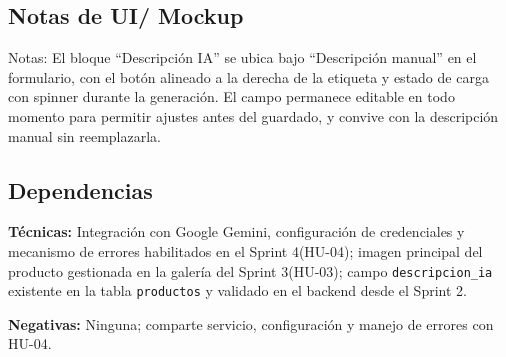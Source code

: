 \documentclass[12pt,a4paper]{article}
\begin{document}
\subsection*{Notas de UI/ Mockup}

\begin{center}

\vspace{0.4cm}

\end{center}

Notas: El bloque ``Descripción IA'' se ubica bajo ``Descripción manual'' en el formulario, con el botón alineado a la derecha de la etiqueta y estado de carga con spinner durante la generación. El campo permanece editable en todo momento para permitir ajustes antes del guardado, y convive con la descripción manual sin reemplazarla.

\subsection*{Dependencias}

\textbf{Técnicas:} Integración con Google Gemini, configuración de credenciales y mecanismo de errores habilitados en el Sprint 4(HU-04); imagen principal del producto gestionada en la galería del Sprint 3(HU-03); campo \texttt{descripcion\_ia} existente en la tabla \texttt{productos} y validado en el backend desde el Sprint 2.

\textbf{Negativas:} Ninguna; comparte servicio, configuración y manejo de errores con HU-04.
\end{document}
